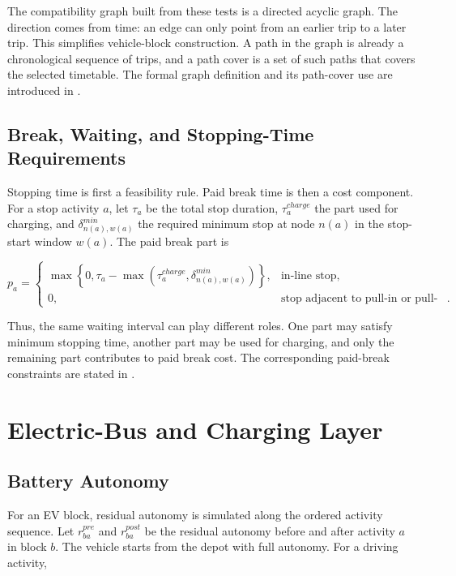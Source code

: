 The compatibility graph built from these tests is a directed acyclic graph. The
direction comes from time: an edge can only point from an earlier trip to a
later trip. This simplifies vehicle-block construction. A path in the graph is
already a chronological sequence of trips, and a path cover is a set of such
paths that covers the selected timetable. The formal graph definition and its
path-cover use are introduced in .

\subsection{Break, Waiting, and Stopping-Time Requirements}

Stopping time is first a feasibility rule. Paid break time is then a cost
component. For a stop activity \(a\), let \(\tau_a\) be the total stop
duration, \(\tau_a^{charge}\) the part used for charging, and
\(\delta^{min}_{n(a),w(a)}\) the required minimum stop at node \(n(a)\) in
the stop-start window \(w(a)\). The paid break part is

\begin{equation}
p_a=
\begin{cases}
\max\left\{0,\tau_a-\max(\tau_a^{charge},\delta^{min}_{n(a),w(a)})\right\},
&\text{in-line stop},\\[1ex]
0,&\text{stop adjacent to pull-in or pull-out}.
\end{cases}
\label{eq:problem-paid-break}
\end{equation}

Thus, the same waiting interval can play different roles. One part may satisfy
minimum stopping time, another part may be used for charging, and only the
remaining part contributes to paid break cost. The corresponding paid-break
constraints are stated in .

\section{Electric-Bus and Charging Layer}

\subsection{Battery Autonomy}

For an EV block, residual autonomy is simulated along the ordered activity
sequence. Let \(r_{ba}^{pre}\) and \(r_{ba}^{post}\) be the residual autonomy
before and after activity \(a\) in block \(b\). The vehicle starts from the
depot with full autonomy. For a driving activity,

